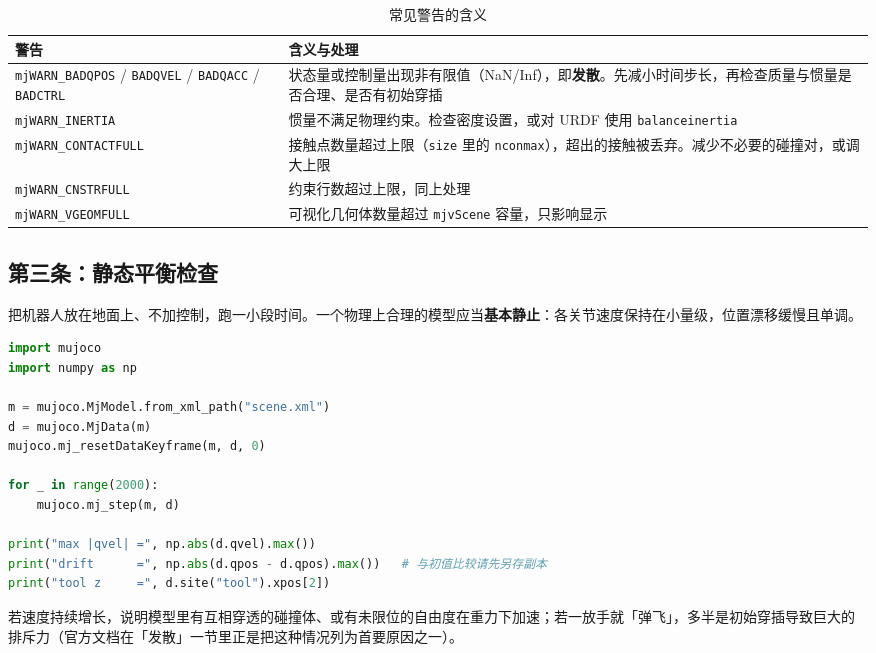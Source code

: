\begin{table}[H]
	\centering
	\caption{常见警告的含义}
	\label{tab:Debug:警告}
	\footnotesize
	\begin{tabular}{>{\raggedright\arraybackslash}p{4.2cm}>{\raggedright\arraybackslash}p{10.0cm}}
		\hline
		警告 & 含义与处理 \\
		\hline
		\texttt{mjWARN\_BADQPOS} / \texttt{BADQVEL} / \texttt{BADQACC} / \texttt{BADCTRL} & 状态量或控制量出现非有限值（NaN/Inf），即\textbf{发散}。先减小时间步长，再检查质量与惯量是否合理、是否有初始穿插 \\
		\texttt{mjWARN\_INERTIA} & 惯量不满足物理约束。检查密度设置，或对 URDF 使用 \texttt{balanceinertia} \\
		\texttt{mjWARN\_CONTACTFULL} & 接触点数量超过上限（\texttt{size} 里的 \texttt{nconmax}），超出的接触被丢弃。减少不必要的碰撞对，或调大上限 \\
		\texttt{mjWARN\_CNSTRFULL} & 约束行数超过上限，同上处理 \\
		\texttt{mjWARN\_VGEOMFULL} & 可视化几何体数量超过 \texttt{mjvScene} 容量，只影响显示 \\
		\hline
	\end{tabular}
\end{table}

\subsection{第三条：静态平衡检查}

把机器人放在地面上、不加控制，跑一小段时间。一个物理上合理的模型应当\textbf{基本静止}：各关节速度保持在小量级，位置漂移缓慢且单调。

\begin{lstlisting}[style=code, language=Python]
import mujoco
import numpy as np

m = mujoco.MjModel.from_xml_path("scene.xml")
d = mujoco.MjData(m)
mujoco.mj_resetDataKeyframe(m, d, 0)

for _ in range(2000):
    mujoco.mj_step(m, d)

print("max |qvel| =", np.abs(d.qvel).max())
print("drift      =", np.abs(d.qpos - d.qpos).max())   # 与初值比较请先另存副本
print("tool z     =", d.site("tool").xpos[2])
\end{lstlisting}

若速度持续增长，说明模型里有互相穿透的碰撞体、或有未限位的自由度在重力下加速；若一放手就「弹飞」，多半是初始穿插导致巨大的排斥力（官方文档在「发散」一节里正是把这种情况列为首要原因之一）。

